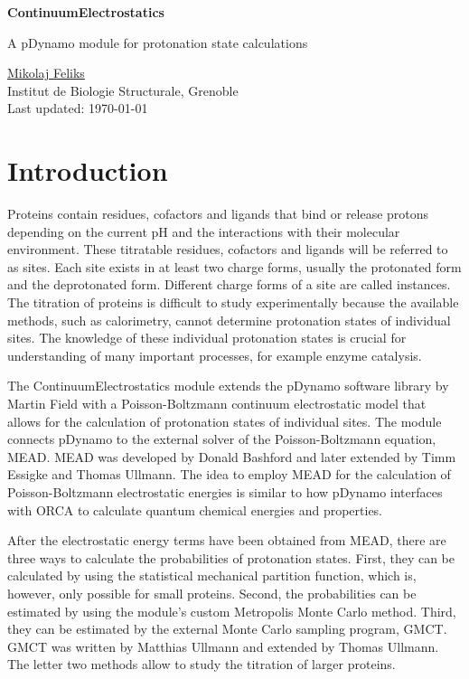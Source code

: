 \documentclass[a4paper,11pt]{article}
\newcommand{\modulename}{ContinuumElectrostatics\xspace}
\begin{document}
\begin{center}
{\LARGE \bf \modulename}

{\large
A pDynamo module for protonation state calculations

\vspace{1.0cm}
\underline{Mikolaj Feliks}\\
Institut de Biologie Structurale, Grenoble\\

Last updated: \today %
}

\vspace{0.5cm}

\end{center}


\section{Introduction}
Proteins contain residues, cofactors and ligands that bind or release protons
depending on the current pH and the interactions with their molecular
environment.
%
These titratable residues, cofactors and ligands will be referred to as sites.
%
Each site exists in at least two charge forms, usually the protonated form and 
the deprotonated form.
%
Different charge forms of a site are called instances.
%
The titration of proteins is difficult to study experimentally because
the available methods, such as calorimetry, cannot determine protonation states
of individual sites.
%
The knowledge of these individual protonation states is crucial for
understanding of many important processes, for example enzyme catalysis\cite{Bombarda2010}.


The \modulename module extends the pDynamo software library by 
Martin Field\cite{pDynamo_Field2008}  with a Poisson-Boltz\-mann continuum electrostatic 
model that allows for the calculation of protonation states of individual 
sites\cite{Bashford1992,Ullmann1999,Bombarda2006}.
%
The module connects pDynamo to the external solver of the Poisson-Boltzmann 
equation, MEAD\cite{Bashford1997}.
%
MEAD was developed by Donald Bashford and 
later extended by Timm Essigke\cite{Essigke_PhD} and Thomas Ullmann\cite{Thomas_PhD}.
%
The idea to employ MEAD for the calculation of Poisson-Boltzmann electrostatic energies
is similar to how pDynamo interfaces with ORCA to calculate
quantum chemical energies and properties.
%

After the electrostatic energy terms have been obtained from MEAD,
there are three ways to calculate the probabilities of protonation states.
%
First,
they can be calculated by using the statistical mechanical partition function,
which is, however, only possible for small proteins.
%
Second,
the probabilities can be estimated by using the module's custom
Metropolis Monte Carlo method\cite{Beroza1991}.
%
Third,
they can be estimated by the external Monte Carlo sampling program, 
GMCT\cite{Ullmann2012,Thomas_PhD}.
%
GMCT was written by Matthias Ullmann and extended by Thomas Ullmann.
%
The letter two methods allow to study the titration of larger proteins.
\end{document}
